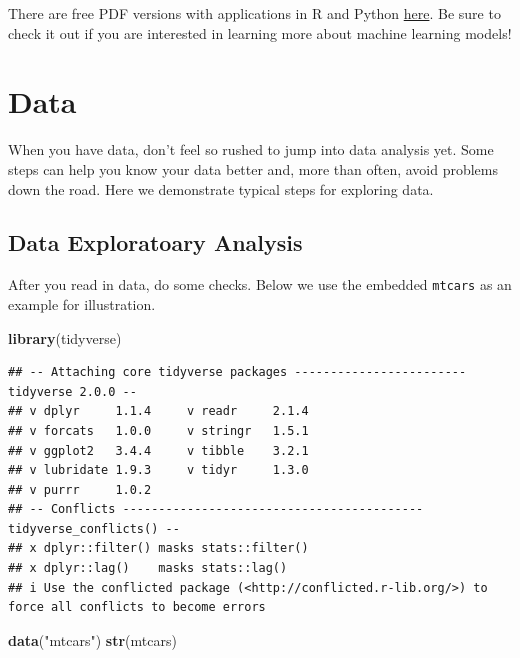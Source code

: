 \documentclass[
]{book}
\newenvironment{Shaded}{\begin{snugshade}}{\end{snugshade}}
\newcommand{\FunctionTok}[1]{\textcolor[rgb]{0.13,0.29,0.53}{\textbf{#1}}}
\newcommand{\NormalTok}[1]{#1}
\newcommand{\StringTok}[1]{\textcolor[rgb]{0.31,0.60,0.02}{#1}}
\begin{document}
There are free PDF versions with applications in R and Python \href{https://www.statlearning.com/}{here}. Be sure to check it out if you are interested in learning more about machine learning models!

\hypertarget{data}{%
\chapter{Data}\label{data}}

When you have data, don't feel so rushed to jump into data analysis yet. Some steps can help you know your data better and, more than often, avoid problems down the road. Here we demonstrate typical steps for exploring data.

\hypertarget{data-exploratoary-analysis}{%
\section{Data Exploratoary Analysis}\label{data-exploratoary-analysis}}

After you read in data, do some checks. Below we use the embedded \texttt{mtcars} as an example for illustration.

\begin{Shaded}
\begin{Highlighting}[]
\FunctionTok{library}\NormalTok{(tidyverse)}
\end{Highlighting}
\end{Shaded}

\begin{verbatim}
## -- Attaching core tidyverse packages ------------------------ tidyverse 2.0.0 --
## v dplyr     1.1.4     v readr     2.1.4
## v forcats   1.0.0     v stringr   1.5.1
## v ggplot2   3.4.4     v tibble    3.2.1
## v lubridate 1.9.3     v tidyr     1.3.0
## v purrr     1.0.2     
## -- Conflicts ------------------------------------------ tidyverse_conflicts() --
## x dplyr::filter() masks stats::filter()
## x dplyr::lag()    masks stats::lag()
## i Use the conflicted package (<http://conflicted.r-lib.org/>) to force all conflicts to become errors
\end{verbatim}

\begin{Shaded}
\begin{Highlighting}[]
\FunctionTok{data}\NormalTok{(}\StringTok{"mtcars"}\NormalTok{)}
\FunctionTok{str}\NormalTok{(mtcars)}
\end{Highlighting}
\end{Shaded}
\end{document}
